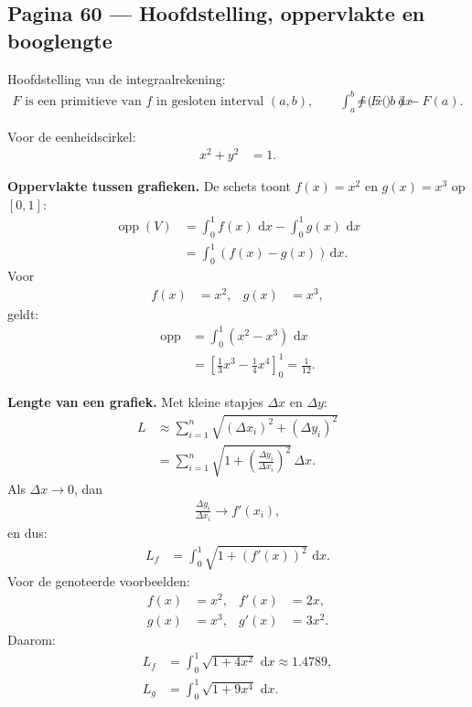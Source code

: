 \documentclass[11pt]{article}
\newcommand{\dd}{\,\mathrm{d}}
\begin{document}
\subsection*{Pagina 60 --- Hoofdstelling, oppervlakte en booglengte}

Hoofdstelling van de integraalrekening:
\begin{align*}
F\text{ is een primitieve van }f\text{ in gesloten interval }(a,b),\qquad
\int_a^b f(x)\,\dd x
&=
F(b)-F(a).
\end{align*}

Voor de eenheidscirkel:
\begin{align*}
x^2+y^2&=1.
\end{align*}

\textbf{Oppervlakte tussen grafieken.}
De schets toont $f(x)=x^2$ en $g(x)=x^3$ op $[0,1]$:
\begin{align*}
\operatorname{opp}(V)
&=
\int_0^1 f(x)\,\dd x
-
\int_0^1 g(x)\,\dd x\\
&=
\int_0^1\left(f(x)-g(x)\right)\dd x.
\end{align*}
Voor
\begin{align*}
f(x)&=x^2,&g(x)&=x^3,
\end{align*}
geldt:
\begin{align*}
\operatorname{opp}
&=
\int_0^1(x^2-x^3)\,\dd x\\
&=
\left[\frac{1}{3}x^3-\frac{1}{4}x^4\right]_0^1
=
\frac{1}{12}.
\end{align*}

\textbf{Lengte van een grafiek.}
Met kleine stapjes $\Delta x$ en $\Delta y$:
\begin{align*}
L
&\approx
\sum_{i=1}^{n}\sqrt{(\Delta x_i)^2+(\Delta y_i)^2}\\
&=
\sum_{i=1}^{n}
\sqrt{1+\left(\frac{\Delta y_i}{\Delta x_i}\right)^2}\,\Delta x.
\end{align*}
Als $\Delta x\to 0$, dan
\begin{align*}
\frac{\Delta y_i}{\Delta x_i}\to f'(x_i),
\end{align*}
en dus:
\begin{align*}
L_f
&=
\int_0^1 \sqrt{1+\left(f'(x)\right)^2}\,\dd x.
\end{align*}
Voor de genoteerde voorbeelden:
\begin{align*}
f(x)&=x^2,&f'(x)&=2x,\\
g(x)&=x^3,&g'(x)&=3x^2.
\end{align*}
Daarom:
\begin{align*}
L_f
&=
\int_0^1 \sqrt{1+4x^2}\,\dd x
\approx 1.4789,\\
L_g
&=
\int_0^1 \sqrt{1+9x^4}\,\dd x.
\end{align*}
\end{document}
